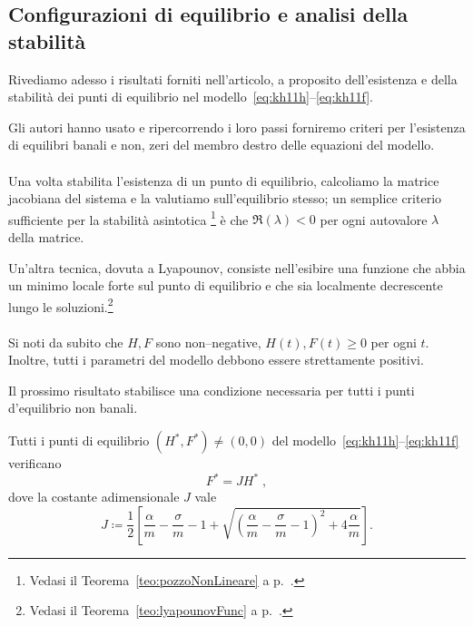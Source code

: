 \subsection[Configurazioni di equilibrio]{Configurazioni di equilibrio e analisi della stabilità}
Rivediamo adesso i risultati forniti nell'articolo, a proposito dell'esistenza e della stabilità
dei punti di equilibrio nel modello~\eqref{eq:kh11h}--\eqref{eq:kh11f}.

Gli autori hanno usato  e ripercorrendo i loro passi forniremo criteri per l'esistenza
di equilibri banali e non, \ie zeri del membro destro delle equazioni del modello.

\paragraph{}
Una volta stabilita l'esistenza di un punto di equilibrio, calcoliamo la matrice jacobiana del sistema e
la valutiamo sull'equilibrio stesso; un semplice criterio sufficiente per la stabilità asintotica
\footnote{Vedasi il Teorema~\ref{teo:pozzoNonLineare} a p.~\pageref{teo:pozzoNonLineare}.}
è che $\Re (\lambda) < 0$ per ogni autovalore $\lambda$ della matrice.

Un'altra tecnica, dovuta a Lyapounov, consiste nell'esibire una funzione che abbia un minimo
locale forte sul punto di equilibrio e che sia localmente decrescente lungo le
soluzioni.\footnote{Vedasi il Teorema~\ref{teo:lyapounovFunc} a p.~\pageref{teo:lyapounovFunc}.}

\paragraph{}
Si noti da subito che $H, F$ sono non--negative, \ie $H(t), F(t) \geq 0$ per ogni $t$.
Inoltre, tutti i parametri del modello debbono essere strettamente positivi.

Il prossimo risultato stabilisce una condizione necessaria per tutti i punti d'equilibrio non banali.

\begin{lemma}
    \label{lem:necessJ}
    Tutti i punti di equilibrio $(H^*, F^*) \neq (0,0)$
    del modello~\eqref{eq:kh11h}--\eqref{eq:kh11f} verificano
    \begin{equation}
    F^* = J H^* \; ,
    \label{eq:FeqJH}
    \end{equation}
    dove la costante adimensionale $J$ vale
    \begin{equation}
        J \coloneq \frac{1}{2} \left[
            \frac{\alpha}{m} - \frac{\sigma}{m} - 1 +
            \sqrt{ {\left( \frac{\alpha}{m} - \frac{\sigma}{m} - 1 \right)}^2
                + 4 \frac{\alpha}{m}
            }
        \right].
        \label{eq:kh11posEqJ}
    \end{equation}
\end{lemma}

